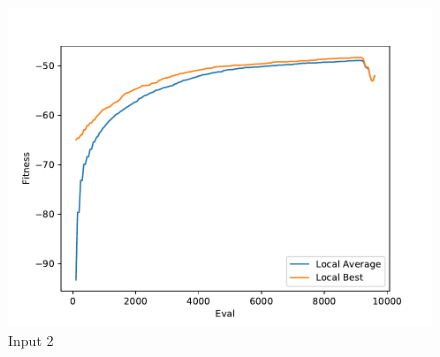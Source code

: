 \documentclass{standalone}
\begin{document}
\begin{figure}[!htb]
	\caption{Input 2}
	\label{fig:graph_2024}
	\includegraphics[width=\textwidth]{../graphs/graphs/2024.pdf}
\end{figure}
\end{document}

